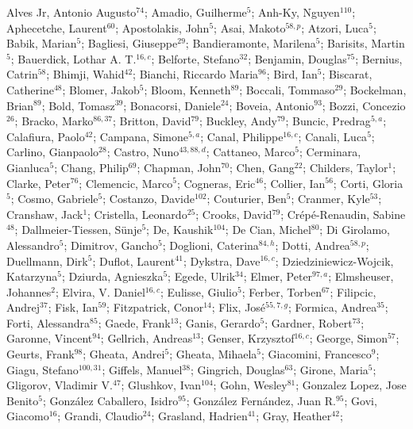 Alves Jr, Antonio Augusto$^{74}$;
Amadio, Guilherme$^{5}$;
Anh-Ky, Nguyen$^{110}$;
Aphecetche, Laurent$^{60}$;
Apostolakis, John$^{5}$;
Asai, Makoto$^{58,p}$;
Atzori, Luca$^{5}$;
Babik, Marian$^{5}$;
Bagliesi, Giuseppe$^{29}$;
Bandieramonte, Marilena$^{5}$;
Barisits, Martin$^{5}$;
Bauerdick, Lothar A. T.$^{16,c}$;
Belforte, Stefano$^{32}$;
Benjamin, Douglas$^{75}$;
Bernius, Catrin$^{58}$;
Bhimji, Wahid$^{42}$;
Bianchi, Riccardo Maria$^{96}$;
Bird, Ian$^{5}$;
Biscarat, Catherine$^{48}$;
Blomer, Jakob$^{5}$;
Bloom, Kenneth$^{89}$;
Boccali, Tommaso$^{29}$;
Bockelman, Brian$^{89}$;
Bold, Tomasz$^{39}$;
Bonacorsi, Daniele$^{24}$;
Boveia, Antonio$^{93}$;
Bozzi, Concezio$^{26}$;
Bracko, Marko$^{86,37}$;
Britton, David$^{79}$;
Buckley, Andy$^{79}$;
Buncic, Predrag$^{5,a}$;
Calafiura, Paolo$^{42}$;
Campana, Simone$^{5,a}$;
Canal, Philippe$^{16,c}$;
Canali, Luca$^{5}$;
Carlino, Gianpaolo$^{28}$;
Castro, Nuno$^{43,88,d}$;
Cattaneo, Marco$^{5}$;
Cerminara, Gianluca$^{5}$;
Chang, Philip$^{69}$;
Chapman, John$^{70}$;
Chen, Gang$^{22}$;
Childers, Taylor$^{1}$;
Clarke, Peter$^{76}$;
Clemencic, Marco$^{5}$;
Cogneras, Eric$^{46}$;
Collier, Ian$^{56}$;
Corti, Gloria$^{5}$;
Cosmo, Gabriele$^{5}$;
Costanzo, Davide$^{102}$;
Couturier, Ben$^{5}$;
Cranmer, Kyle$^{53}$;
Cranshaw, Jack$^{1}$;
Cristella, Leonardo$^{25}$;
Crooks, David$^{79}$;
Crépé-Renaudin, Sabine$^{48}$;
Dallmeier-Tiessen, Sünje$^{5}$;
De, Kaushik$^{104}$;
De Cian, Michel$^{80}$;
Di Girolamo, Alessandro$^{5}$;
Dimitrov, Gancho$^{5}$;
Doglioni, Caterina$^{84,h}$;
Dotti, Andrea$^{58,p}$;
Duellmann, Dirk$^{5}$;
Duflot, Laurent$^{41}$;
Dykstra, Dave$^{16,c}$;
Dziedziniewicz-Wojcik, Katarzyna$^{5}$;
Dziurda, Agnieszka$^{5}$;
Egede, Ulrik$^{34}$;
Elmer, Peter$^{97,a}$;
Elmsheuser, Johannes$^{2}$;
Elvira, V. Daniel$^{16,c}$;
Eulisse, Giulio$^{5}$;
Ferber, Torben$^{67}$;
Filipcic, Andrej$^{37}$;
Fisk, Ian$^{59}$;
Fitzpatrick, Conor$^{14}$;
Flix, José$^{55,7,g}$;
Formica, Andrea$^{35}$;
Forti, Alessandra$^{85}$;
Gaede, Frank$^{13}$;
Ganis, Gerardo$^{5}$;
Gardner, Robert$^{73}$;
Garonne, Vincent$^{94}$;
Gellrich, Andreas$^{13}$;
Genser, Krzysztof$^{16,c}$;
George, Simon$^{57}$;
Geurts, Frank$^{98}$;
Gheata, Andrei$^{5}$;
Gheata, Mihaela$^{5}$;
Giacomini, Francesco$^{9}$;
Giagu, Stefano$^{100,31}$;
Giffels, Manuel$^{38}$;
Gingrich, Douglas$^{63}$;
Girone, Maria$^{5}$;
Gligorov, Vladimir V.$^{47}$;
Glushkov, Ivan$^{104}$;
Gohn, Wesley$^{81}$;
Gonzalez Lopez, Jose Benito$^{5}$;
González Caballero, Isidro$^{95}$;
González Fernández, Juan R.$^{95}$;
Govi, Giacomo$^{16}$;
Grandi, Claudio$^{24}$;
Grasland, Hadrien$^{41}$;
Gray, Heather$^{42}$;
